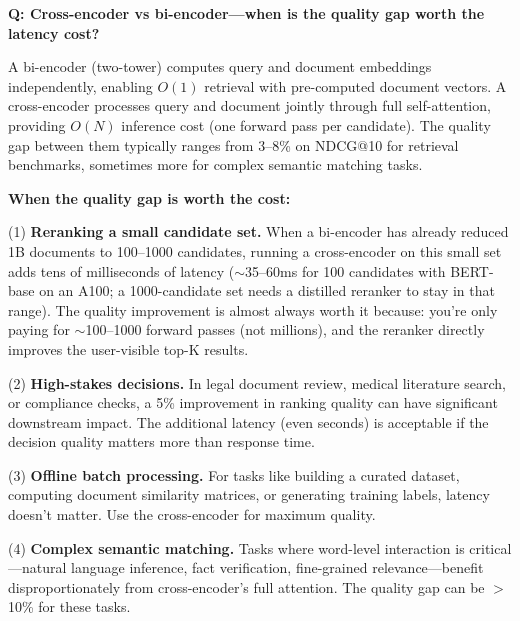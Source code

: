 \begin{interviewq}
\end{interviewq}


\begin{interviewq}
\textbf{Q: Cross-encoder vs bi-encoder---when is the quality gap worth the latency cost?}

 \quad {} \quad \badgefreq{\freqhigh}

\stronganswer

A bi-encoder (two-tower) computes query and document embeddings independently, enabling $O(1)$ retrieval with pre-computed document vectors. A cross-encoder processes query and document jointly through full self-attention, providing $O(N)$ inference cost (one forward pass per candidate). The quality gap between them typically ranges from 3--8\% on NDCG@10 for retrieval benchmarks, sometimes more for complex semantic matching tasks.

\textbf{When the quality gap is worth the cost:}

(1) \textbf{Reranking a small candidate set.} When a bi-encoder has already reduced 1B documents to 100--1000 candidates, running a cross-encoder on this small set adds tens of milliseconds of latency ($\sim$35--60ms for 100 candidates with BERT-base on an A100; a 1000-candidate set needs a distilled reranker to stay in that range). The quality improvement is almost always worth it because: you're only paying for $\sim$100--1000 forward passes (not millions), and the reranker directly improves the user-visible top-K results.

(2) \textbf{High-stakes decisions.} In legal document review, medical literature search, or compliance checks, a 5\% improvement in ranking quality can have significant downstream impact. The additional latency (even seconds) is acceptable if the decision quality matters more than response time.

(3) \textbf{Offline batch processing.} For tasks like building a curated dataset, computing document similarity matrices, or generating training labels, latency doesn't matter. Use the cross-encoder for maximum quality.

(4) \textbf{Complex semantic matching.} Tasks where word-level interaction is critical---natural language inference, fact verification, fine-grained relevance---benefit disproportionately from cross-encoder's full attention. The quality gap can be $>$10\% for these tasks.


\end{interviewq}
